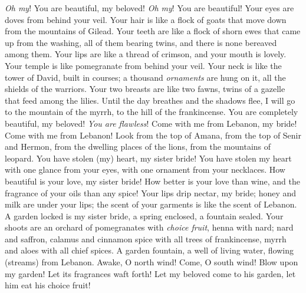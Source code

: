 \begin{biblechapter} %
 \textit{Oh my}! You are beautiful, my beloved! 
\textit{Oh my}! You are beautiful! 
Your eyes are doves 
from behind your veil. 
Your hair is like a flock of goats 
that move down from the mountains of Gilead.
\verse Your teeth are like a flock of shorn ewes 
that came up from the washing, 
all of them bearing twins, 
and there is none bereaved among them.
\verse Your lips are like a thread of crimson, 
and your mouth is lovely. 
Your temple is like pomegranate 
from behind your veil.
\verse Your neck is like the tower of David, 
built in courses; 
a thousand \textit{ornaments} are hung on it, 
all the shields of the warriors.
\verse Your two breasts are like two fawns, 
twins of a gazelle that feed among the lilies.
\verse Until the day breathes and the shadows flee, 
I will go to the mountain of the myrrh, 
to the hill of the frankincense.
\verse You are completely beautiful, my beloved! 
\textit{You are flawless}!
 Come with me from Lebanon, my bride! 
Come with me from Lebanon! 
Look from the top of Amana, 
from the top of Senir and Hermon, 
from the dwelling places of the lions, 
from the mountains of leopard.
\verse You have stolen (my) heart, my sister bride! 
You have stolen my heart with one glance from your eyes, 
with one ornament from your necklaces.
\verse How beautiful is your love, my sister bride! 
How better is your love than wine, 
and the fragrance of your oils than any spice!
\verse Your lips drip nectar, my bride; 
honey and milk are under your lips; 
the scent of your garments is like the scent of Lebanon.
 A garden locked is my sister bride, 
a spring enclosed, a fountain sealed.
\verse Your shoots are an orchard of pomegranates with \textit{choice fruit}, 
henna with nard;
\verse nard and saffron, calamus and cinnamon spice with all trees of frankincense, 
myrrh and aloes with all chief spices.
\verse A garden fountain, a well of living water, 
flowing (streams) from Lebanon.
\verse Awake, O north wind! Come, O south wind! 
Blow upon my garden! Let its fragrances waft forth! 
Let my beloved come to his garden, 
let him eat his choice fruit!
\end{biblechapter}

